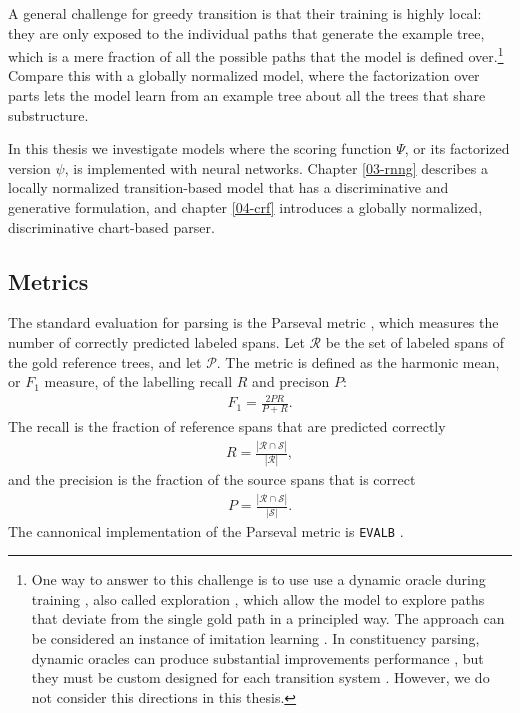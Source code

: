     A general challenge for greedy transition is that their training is highly local: they are only exposed to the individual paths that generate the example tree, which is a mere fraction of all the possible paths that the model is defined over.\footnote{One way to answer to this challenge is to use use a dynamic oracle during training \citep{goldberg2013dynamic}, also called exploration \citep{ballesteros2016exploration,stern2017minimal}, which allow the model to explore paths that deviate from the single gold path in a principled way. The approach can be considered an instance of imitation learning \citep{vlachos2012imitation,he2012imitation}. In constituency parsing, dynamic oracles can produce substantial improvements performance \citep{ballesteros2016exploration}, but they must be custom designed for each transition system \citep{klein2018reinforce}. However, we do not consider this directions in this thesis.} Compare this with a globally normalized model, where the factorization over parts lets the model learn from an example tree about all the trees that share substructure.

    In this thesis we investigate models where the scoring function $\Psi$, or its factorized version $\psi$, is implemented with neural networks. Chapter \ref{03-rnng} describes a locally normalized transition-based model that has a discriminative and generative formulation, and chapter \ref{04-crf} introduces a globally normalized, discriminative chart-based parser.


  \subsection{Metrics}
    The standard evaluation for parsing is the Parseval metric \citep{black1991parseval}, which measures the number of correctly predicted labeled spans. Let $\mathcal{R}$ be the set of labeled spans of the gold reference trees, and let $\mathcal{P}$. The metric is defined as the harmonic mean, or $F_1$ measure, of the labelling recall $R$ and precison $P$:
    \begin{align}
      \label{eq:fscore}
      F_1 = \frac{2 PR}{P + R}.
    \end{align}
    The recall is the fraction of reference spans that are predicted correctly
    \begin{align*}
      R = \frac{|\mathcal{R} \cap \mathcal{S}|}{|\mathcal{R}|},
    \end{align*}
    and the precision is the fraction of the source spans that is correct
    \begin{align*}
      P = \frac{|\mathcal{R} \cap \mathcal{S}|}{|\mathcal{S}|}.
    \end{align*}
    The cannonical implementation of the Parseval metric is \verb!EVALB! \citep{sekine1997evalb}.


